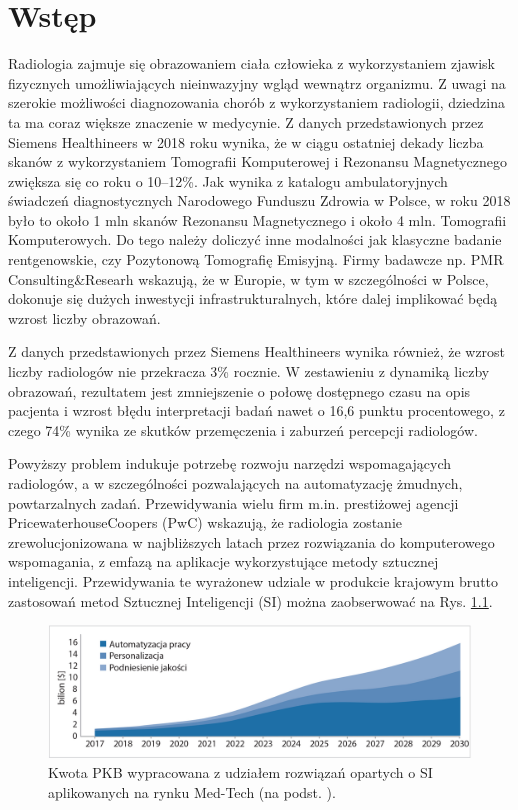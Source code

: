 \chapter{Wstęp}

Radiologia zajmuje się obrazowaniem ciała człowieka z wykorzystaniem zjawisk fizycznych umożliwiających nieinwazyjny wgląd wewnątrz organizmu. Z uwagi \linebreak na szerokie możliwości diagnozowania chorób z wykorzystaniem radiologii, dziedzina ta ma coraz większe znaczenie w medycynie. Z danych przedstawionych przez Siemens Healthineers w 2018 roku wynika, że w ciągu ostatniej dekady liczba skanów z wykorzystaniem Tomografii Komputerowej i Rezonansu Magnetycznego zwiększa się co roku o 10--12\%. Jak wynika z katalogu ambulatoryjnych świadczeń diagnostycznych Narodowego Funduszu Zdrowia w Polsce, w roku 2018 było to około 1 mln skanów Rezonansu Magnetycznego i około 4 mln. Tomografii Komputerowych. Do tego należy doliczyć inne modalności jak klasyczne badanie rentgenowskie, czy Pozytonową Tomografię Emisyjną. Firmy badawcze np. PMR Consulting\&Researh wskazują, że w Europie, w tym w szczególności w Polsce, dokonuje się dużych inwestycji infrastrukturalnych, które dalej implikować będą wzrost liczby obrazowań.
  
Z danych przedstawionych przez Siemens Healthineers wynika również, że wzrost liczby radiologów nie przekracza 3\% rocznie. W zestawieniu z dynamiką liczby obrazowań, rezultatem jest zmniejszenie o połowę dostępnego czasu na opis pacjenta i wzrost błędu interpretacji badań nawet o 16,6 punktu procentowego, z czego 74\% wynika ze skutków przemęczenia i zaburzeń percepcji radiologów.  

Powyższy problem indukuje potrzebę rozwoju narzędzi wspomagających radiologów, a w szczególności pozwalających na automatyzację żmudnych, powtarzalnych zadań. Przewidywania wielu firm m.in. prestiżowej agencji PricewaterhouseCoopers (PwC) wskazują, że radiologia zostanie zrewolucjonizowana w najbliższych latach przez rozwiązania do komputerowego wspomagania, z emfazą na aplikacje wykorzystujące metody sztucznej inteligencji. Przewidywania te wyrażone\linebreak w udziale w produkcie krajowym brutto zastosowań metod Sztucznej Inteligencji (SI) można zaobserwować na Rys. \ref{MedTechGrowth}. 
\begin{figure}[h!]
	\centering
	\includegraphics[width=1.0\textwidth]{figures/AI_w_radiologii.jpg}
	\caption{Kwota PKB wypracowana z udziałem rozwiązań opartych o SI aplikowanych na rynku Med-Tech (na podst. \cite{PWC}).}
	\label{MedTechGrowth}
\end{figure}

